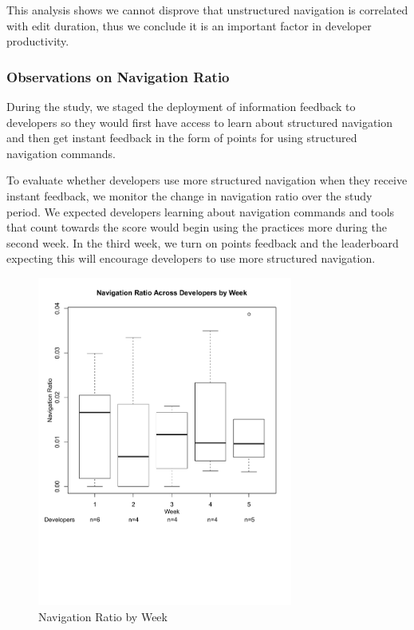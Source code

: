 \documentclass{sig-alternate}
\begin{document}
This analysis shows we cannot disprove that unstructured navigation is correlated with edit duration, thus we conclude it is an important factor in developer productivity.  

\subsubsection{Observations on Navigation Ratio}


During the study, we staged the deployment of information feedback to developers so they would first have access to learn about structured navigation and then get instant feedback in the form of points for using structured navigation commands.  

To evaluate whether developers use more structured navigation when they receive instant feedback, we monitor the change in navigation ratio over the study period.   We expected developers learning about navigation commands and tools that count towards the score would begin using the practices more during the second week.  In the third week, we turn on points feedback and the leaderboard expecting this will encourage developers to use more structured navigation.  

\begin{figure}
	\includegraphics[width=3.3in]{navratioboxplot_ann.pdf}
	\caption{Navigation Ratio by Week}
	\label{fig:navigationaverage}
\end{figure}
\end{document}
